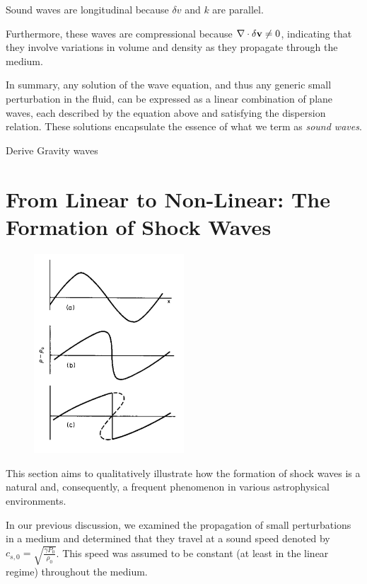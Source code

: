 {\color{red}Sound waves are longitudinal because \( \delta v \) and \( k  \) are parallel.}

Furthermore, these waves are compressional because \( \nabla \cdot \delta \vb v \ne 0 \), indicating that they involve variations in volume and density as they propagate through the medium.

In summary, any solution of the wave equation, and thus any generic small perturbation in the fluid, can be expressed as a linear combination of plane waves, each described by the equation above and satisfying the dispersion relation. These solutions encapsulate the essence of what we term as \emph{sound waves}.

\begin{problem}
Derive Gravity waves
\end{problem}

\section{From Linear to Non-Linear: The Formation of Shock Waves}

\begin{figure}[!t]
\centering
\includegraphics[width=0.5\textwidth]{figures/shocklandau.pdf}
\caption{}
\end{figure}

This section aims to qualitatively illustrate how the formation of shock waves is a natural and, consequently, a frequent phenomenon in various astrophysical environments.

In our previous discussion, we examined the propagation of small perturbations in a medium and determined that they travel at a sound speed denoted by \( c_{s,0} = \sqrt{ \frac{\gamma P_0}{\rho_0}} \). This speed was assumed to be constant (at least in the linear regime) throughout the medium.

